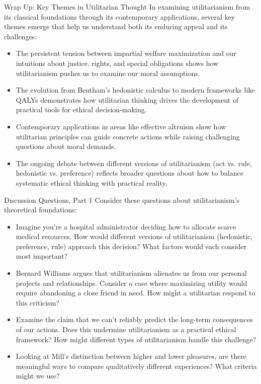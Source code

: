 \documentclass[aspectratio=169]{beamer}
\begin{document}
\begin{frame}{Wrap Up: Key Themes in Utilitarian Thought}
    In examining utilitarianism from its classical foundations through its contemporary applications, several key themes emerge that help us understand both its enduring appeal and its challenges:
    
    \begin{itemize}
        \item The persistent tension between impartial welfare maximization and our intuitions about justice, rights, and special obligations shows how utilitarianism pushes us to examine our moral assumptions.
        
        \item The evolution from Bentham's hedonistic calculus to modern frameworks like QALYs demonstrates how utilitarian thinking drives the development of practical tools for ethical decision-making.
        
        \item Contemporary applications in areas like effective altruism show how utilitarian principles can guide concrete actions while raising challenging questions about moral demands.
        
        \item The ongoing debate between different versions of utilitarianism (act vs. rule, hedonistic vs. preference) reflects broader questions about how to balance systematic ethical thinking with practical reality.
    \end{itemize}
\end{frame}

\begin{frame}{Discussion Questions, Part 1}
    Consider these questions about utilitarianism's theoretical foundations:
    \begin{itemize}
        \item Imagine you're a hospital administrator deciding how to allocate scarce medical resources. How would different versions of utilitarianism (hedonistic, preference, rule) approach this decision? What factors would each consider most important?
        
        \item Bernard Williams argues that utilitarianism alienates us from our personal projects and relationships. Consider a case where maximizing utility would require abandoning a close friend in need. How might a utilitarian respond to this criticism?
        
        \item Examine the claim that we can't reliably predict the long-term consequences of our actions. Does this undermine utilitarianism as a practical ethical framework? How might different types of utilitarianism handle this challenge?
        
        \item Looking at Mill's distinction between higher and lower pleasures, are there meaningful ways to compare qualitatively different experiences? What criteria might we use?
    \end{itemize}
\end{frame}
\end{document}
